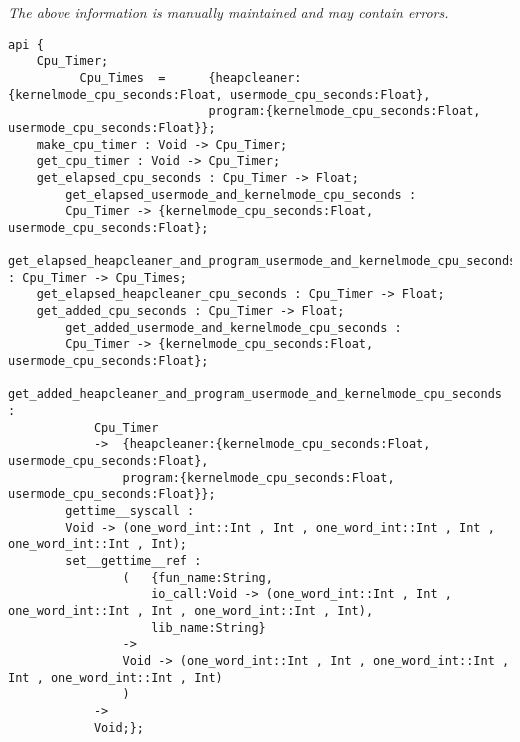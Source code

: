 \label{api:Cpu\_Timer}

{\tiny \it The above information is manually maintained and may contain errors.}
\begin{verbatim}
api {
    Cpu_Timer;
          Cpu_Times  =      {heapcleaner:{kernelmode_cpu_seconds:Float, usermode_cpu_seconds:Float},
                            program:{kernelmode_cpu_seconds:Float, usermode_cpu_seconds:Float}};
    make_cpu_timer : Void -> Cpu_Timer;
    get_cpu_timer : Void -> Cpu_Timer;
    get_elapsed_cpu_seconds : Cpu_Timer -> Float;
        get_elapsed_usermode_and_kernelmode_cpu_seconds :
        Cpu_Timer -> {kernelmode_cpu_seconds:Float, usermode_cpu_seconds:Float};
    get_elapsed_heapcleaner_and_program_usermode_and_kernelmode_cpu_seconds : Cpu_Timer -> Cpu_Times;
    get_elapsed_heapcleaner_cpu_seconds : Cpu_Timer -> Float;
    get_added_cpu_seconds : Cpu_Timer -> Float;
        get_added_usermode_and_kernelmode_cpu_seconds :
        Cpu_Timer -> {kernelmode_cpu_seconds:Float, usermode_cpu_seconds:Float};
        get_added_heapcleaner_and_program_usermode_and_kernelmode_cpu_seconds :
            Cpu_Timer
            ->  {heapcleaner:{kernelmode_cpu_seconds:Float, usermode_cpu_seconds:Float},
                program:{kernelmode_cpu_seconds:Float, usermode_cpu_seconds:Float}};
        gettime__syscall :
        Void -> (one_word_int::Int , Int , one_word_int::Int , Int , one_word_int::Int , Int);
        set__gettime__ref :
                (   {fun_name:String,
                    io_call:Void -> (one_word_int::Int , Int , one_word_int::Int , Int , one_word_int::Int , Int),
                    lib_name:String}
                ->
                Void -> (one_word_int::Int , Int , one_word_int::Int , Int , one_word_int::Int , Int)
                )
            ->
            Void;};
\end{verbatim}

